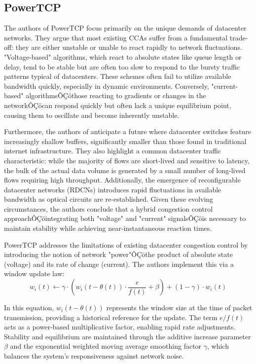 \documentclass[conference]{IEEEtran}
\begin{document}
\subsection{PowerTCP}

The authors of PowerTCP focus primarily on the unique demands of datacenter networks\cite{PowerTCP}. 
They argue that most existing \acs{CCA}s suffer from a fundamental trade-off: 
they are either unstable or unable to react rapidly to network fluctuations. 
"Voltage-based" algorithms, which react to absolute states like queue length or delay, tend to be stable but are often too slow to respond to the bursty traffic patterns typical of datacenters. 
These schemes often fail to utilize available bandwidth quickly, especially in dynamic environments. 
Conversely, "current-based" algorithmsÔÇöthose reacting to gradients or changes in the networkÔÇöcan respond quickly but often lack a unique equilibrium point, causing them to oscillate and become inherently unstable.

Furthermore, the authors of \cite{PowerTCP} anticipate a future where datacenter switches feature increasingly shallow buffers, significantly smaller than those found in traditional internet infrastructure. 
They also highlight a common datacenter traffic characteristic: while the majority of flows are short-lived and sensitive to latency, the bulk of the actual data volume is generated by a small number of long-lived flows requiring high throughput. 
Additionally, the emergence of reconfigurable datacenter networks (RDCNs) introduces rapid fluctuations in available bandwidth as optical circuits are re-established. 
Given these evolving circumstances, the authors conclude that a hybrid congestion control approachÔÇöintegrating both "voltage" and "current" signalsÔÇöis necessary to maintain stability while achieving near-instantaneous reaction times.

PowerTCP addresses the limitations of existing datacenter congestion control by introducing the notion of network "power"ÔÇöthe product of absolute state (voltage) and its rate of change (current). 
The authors implement this via a window update law:
\begin{equation} \label{eq:PowerEquation1}
    w_i(t) \leftarrow \gamma \cdot (w_i(t - \theta(t)) \cdot \frac{e}{f(t)} + \beta) + (1 - \gamma) \cdot w_i(t)
\end{equation}

In this equation, $w_i(t - \theta(t))$ represents the window size at the time of packet transmission, providing a historical reference for the update. 
The term $e/f(t)$ acts as a power-based multiplicative factor, enabling rapid rate adjustments. 
Stability and equilibrium are maintained through the additive increase parameter $\beta$ and the exponential weighted moving average smoothing factor $\gamma$, which balances the system's responsiveness against network noise.
\end{document}

